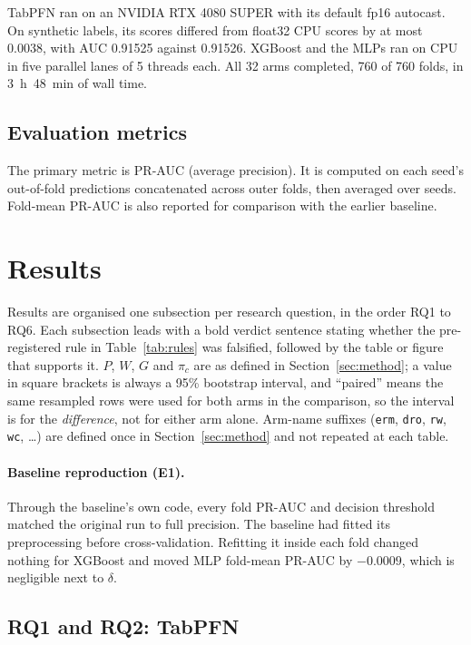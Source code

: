\documentclass[11pt]{article}
\newcommand{\arm}[1]{\texttt{#1}}
\begin{document}
TabPFN ran on an NVIDIA RTX 4080 SUPER with its default fp16 autocast. On synthetic labels, its scores differed from float32 CPU scores by at most 0.0038, with AUC 0.91525 against 0.91526. XGBoost and the MLPs ran on CPU in five parallel lanes of 5 threads each. All 32 arms completed, 760 of 760 folds, in 3~h~48~min of wall time.

\subsection{Evaluation metrics}

The primary metric is PR-AUC (average precision). It is computed on each seed's out-of-fold predictions concatenated across outer folds, then averaged over seeds. Fold-mean PR-AUC is also reported for comparison with the earlier baseline.

\section{Results}
\label{sec:results}

Results are organised one subsection per research question, in the order RQ1 to RQ6. Each subsection leads with a bold verdict sentence stating whether the pre-registered rule in Table~\ref{tab:rules} was falsified, followed by the table or figure that supports it. $P$, $W$, $G$ and $\pi_c$ are as defined in Section~\ref{sec:method}; a value in square brackets is always a 95\% bootstrap interval, and ``paired'' means the same resampled rows were used for both arms in the comparison, so the interval is for the \emph{difference}, not for either arm alone. Arm-name suffixes (\arm{erm}, \arm{dro}, \arm{rw}, \arm{wc}, \ldots) are defined once in Section~\ref{sec:method} and not repeated at each table.

\paragraph{Baseline reproduction (E1).} Through the baseline's own code, every fold PR-AUC and decision threshold matched the original run to full precision. The baseline had fitted its preprocessing before cross-validation. Refitting it inside each fold changed nothing for XGBoost and moved MLP fold-mean PR-AUC by $-0.0009$, which is negligible next to $\delta$.

\subsection{RQ1 and RQ2: TabPFN}
\end{document}
